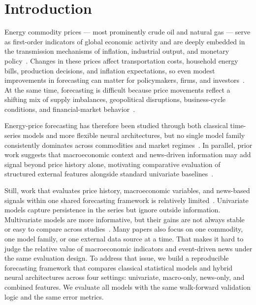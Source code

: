 \documentclass[pdflatex,sn-mathphys-num]{sn-jnl}%
\theoremstyle{thmstyleone}%
\theoremstyle{thmstyletwo}%
\theoremstyle{thmstylethree}%
\begin{document}
\section{Introduction}\label{sec1}

Energy commodity prices --- most prominently crude oil and natural gas --- serve as first-order indicators of global economic activity and are deeply embedded in the transmission mechanisms of inflation, industrial output, and monetary policy~\cite{baumeister2016,hamilton2009,kilian2009}. Changes in these prices affect transportation costs, household energy bills, production decisions, and inflation expectations, so even modest improvements in forecasting can matter for policymakers, firms, and investors~\cite{baumeister2016,hamilton2009}. At the same time, forecasting is difficult because price movements reflect a shifting mix of supply imbalances, geopolitical disruptions, business-cycle conditions, and financial-market behavior~\cite{hamilton2003,kilian2009}.

Energy-price forecasting has therefore been studied through both classical time-series models and more flexible neural architectures, but no single model family consistently dominates across commodities and market regimes~\cite{box1976,hyndman2018,hochreiter1997,sainath2015}. In parallel, prior work suggests that macroeconomic context and news-driven information may add signal beyond price history alone, motivating comparative evaluation of structured external features alongside standard univariate baselines~\cite{kilian2009,tetlock2007,shapiro2022,leetaru2013}.

Still, work that evaluates price history, macroeconomic variables, and news-based signals within one shared forecasting framework is relatively limited~\cite{baumeister2016,shapiro2022}. Univariate models capture persistence in the series but ignore outside information. Multivariate models are more informative, but their gains are not always stable or easy to compare across studies~\cite{box1976,baumeister2016,hyndman2018}. Many papers also focus on one commodity, one model family, or one external data source at a time. That makes it hard to judge the relative value of macroeconomic indicators and event-driven news under the same evaluation design. To address that issue, we build a reproducible forecasting framework that compares classical statistical models and hybrid neural architectures across four settings: univariate, macro-only, news-only, and combined features. We evaluate all models with the same walk-forward validation logic and the same error metrics.
\end{document}
